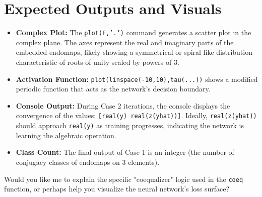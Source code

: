 \section{Expected Outputs and Visuals}
\begin{itemize}
    \item \textbf{Complex Plot:} The \texttt{plot(F,'.')} command generates a scatter plot in the complex plane. The axes represent the real and imaginary parts of the embedded endomaps, likely showing a symmetrical or spiral-like distribution characteristic of roots of unity scaled by powers of 3.
    \item \textbf{Activation Function:} \texttt{plot(linspace(-10,10),tau(...))} shows a modified periodic function that acts as the network's decision boundary.
    \item \textbf{Console Output:} During Case 2 iterations, the console displays the convergence of the values: \texttt{[real(y) real(z(yhat))]}. Ideally, \texttt{real(z(yhat))} should approach \texttt{real(y)} as training progresses, indicating the network is learning the algebraic operation.
    \item \textbf{Class Count:} The final output of Case 1 is an integer (the number of conjugacy classes of endomaps on 3 elements).
\end{itemize}

\vspace{2em}
Would you like me to explain the specific "coequalizer" logic used in the \texttt{coeq} function, or perhaps help you visualize the neural network's loss surface?
